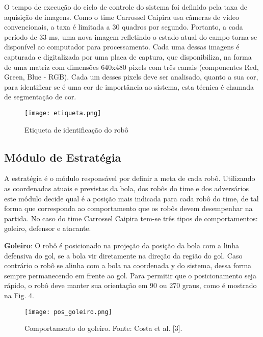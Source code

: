 O tempo de execu{\c c}{\~a}o do ciclo de controle do sistema foi
definido pela taxa de aquisi{\c c}{\~a}o de imagens. Como o time
Carrossel Caipira usa c{\^a}meras de v{\'i}deo convencionais, a taxa {\'e}
limitada a 30 quadros por segundo. Portanto, a cada per{\'i}odo de
33 ms, uma nova imagem refletindo o estado atual do campo
torna-se dispon{\'i}vel ao computador para processamento. Cada
uma dessas imagens {\'e} capturada e digitalizada por uma placa
de captura, que disponibiliza, na forma de uma matriz com
dimensões 640x480 pixels com tr{\^e}s canais (componentes Red,
Green, Blue - RGB). Cada um desses pixels deve ser analisado,
quanto a sua cor, para identificar se {\'e} uma cor de import{\^a}ncia
ao sistema, esta t{\'e}cnica {\'e} chamada de segmenta{\c c}{\~a}o de cor.

\begin{figure}[!htb]
\centering
\texttt{[image: etiqueta.png]}
\caption{ Etiqueta de identifica{\c c}{\~a}o do rob{\^o}}
\label{Rotulo}
\end{figure}

\subsection{M{\'o}dulo de Estrat{\'e}gia}

A estrat{\'e}gia {\'e} o m{\'o}dulo respons{\'a}vel por definir a meta de
cada rob{\^o}. Utilizando as coordenadas atuais e previstas da bola, dos
rob{\^o}s do time e dos advers{\'a}rios este m{\'o}dulo decide qual {\'e} a posi{\c c}{\~a}o 
mais indicada para cada rob{\^o} do time, de tal forma que corresponda ao comportamento que
os rob{\^o}s devem desempenhar na partida. No caso do time Carrossel Caipira
tem-se tr{\^e}s tipos de comportamentos: goleiro, defensor e
atacante.

{\bf Goleiro}: O rob{\^o} {\'e} posicionado na proje{\c c}{\~a}o da posi{\c c}{\~a}o da
bola com a linha defensiva do gol, se a bola vir diretamente na
dire{\c c}{\~a}o da regi{\~a}o do gol. Caso contr{\'a}rio o rob{\^o} se alinha com a
bola na coordenada y do sistema, dessa forma sempre permanecendo em
frente ao gol. Para permitir que o posicionamento seja r{\'a}pido, o rob{\^o} deve
manter sua orienta{\c c}{\~a}o em 90 ou 270 graus, como {\'e} mostrado
na Fig. 4.

\begin{figure}[!htb]
\centering
\texttt{[image: pos\_goleiro.png]}
\caption{Comportamento do goleiro. Fonte: Costa et al. [3].}
\label{Rotulo}
\end{figure}

